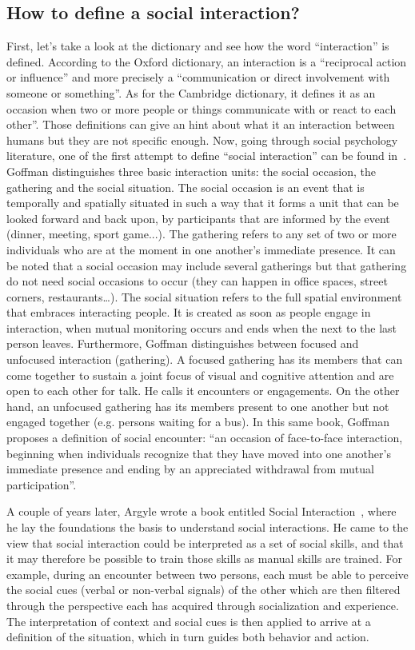 \documentclass[a4paper,11pt,twoside]{StyleThese}
\begin{document}
\subsection{How to define a social interaction?}
First, let’s take a look at the dictionary and see how the word ``interaction'' is defined. According to the Oxford dictionary, an interaction is a ``reciprocal action or influence'' and more precisely a ``communication or direct involvement with someone or something''. As for the Cambridge dictionary, it defines it as an occasion when two or more people or things communicate with or react to each other''. Those definitions can give an hint about what it an interaction between humans but they are not specific enough. Now, going through social psychology literature, one of the first attempt to define ``social interaction'' can be found in~\cite{goffman_1967_interaction}. Goffman distinguishes three basic interaction units: the social occasion, the gathering and the social situation. The social occasion is an event that is temporally and spatially situated in such a way that it forms a unit that can be looked forward and back upon, by participants that are informed by the event (dinner, meeting, sport game...).  The gathering refers to any set of two or more individuals who are at the moment in one another’s immediate presence. It can be noted that a social occasion may include several gatherings but that gathering do not need social occasions to occur (they can happen in office spaces, street corners, restaurants…). The social situation refers to the full spatial environment that embraces interacting people. It is created as soon as people engage in interaction, when mutual monitoring occurs and ends when the next to the last person leaves. Furthermore, Goffman distinguishes between focused and unfocused interaction (gathering). A focused gathering has its members that can come together to sustain a joint focus of visual and cognitive attention and are open to each other for talk. He calls it encounters or engagements. On the other hand, an unfocused gathering has its members present to one another but not engaged together (e.g. persons waiting for a bus). In this same book, Goffman proposes a definition of social encounter: ``an occasion of face-to-face interaction, beginning when individuals recognize that they have moved into one another’s immediate presence and ending by an appreciated withdrawal from mutual participation''.

A couple of years later, Argyle wrote a book entitled Social Interaction~\cite{argyle_1973_social}, where he lay the foundations the basis to understand social interactions. He came to the view that social interaction could be interpreted as a set of social skills, and that it may therefore be possible to train those skills as manual skills are trained. For example, during an encounter between two persons, each must be able to perceive the social cues (verbal or non-verbal signals) of the other which are then filtered through the perspective each has acquired through socialization and experience.  The interpretation of context and social cues is then applied to arrive at a definition of the situation, which in turn guides both behavior and action.
\end{document}
